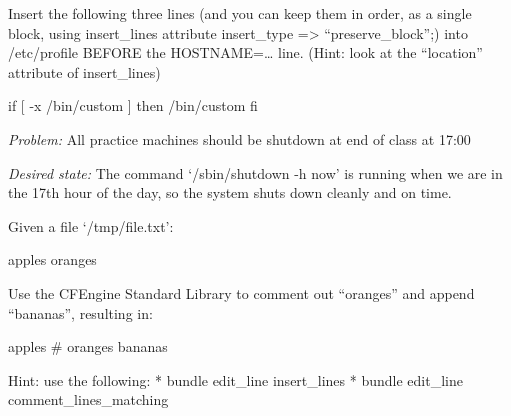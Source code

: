 \begin{aside}
\label{aside:exercise_44}

Insert the following three lines (and you can keep them in order, as a single block, using insert\_lines attribute insert\_type =\textgreater{} ``preserve\_block'';) into /etc/profile BEFORE the HOSTNAME=\ldots{} line.  (Hint: look at the ``location'' attribute of insert\_lines)

\begin{code}
if [ -x /bin/custom ]
  then /bin/custom
fi
\end{code}

\end{aside}





\begin{aside}
\label{aside:exercise_45}

\emph{Problem:}  All practice machines should be shutdown at end of class at 17:00

\emph{Desired state:}  The command `/sbin/shutdown -h now' is running when we are in the 17th hour of the day, so the system shuts down cleanly and on time.

\end{aside}





\begin{aside}
\label{aside:exercise_46}

Given a file `/tmp/file.txt':

\begin{code}
apples
oranges
\end{code}

Use the CFEngine Standard Library to comment out ``oranges'' and append ``bananas'', resulting in:

\begin{code}
apples
# oranges
bananas
\end{code}

Hint: use the following:
* bundle edit\_line insert\_lines
* bundle edit\_line comment\_lines\_matching

\end{aside}





